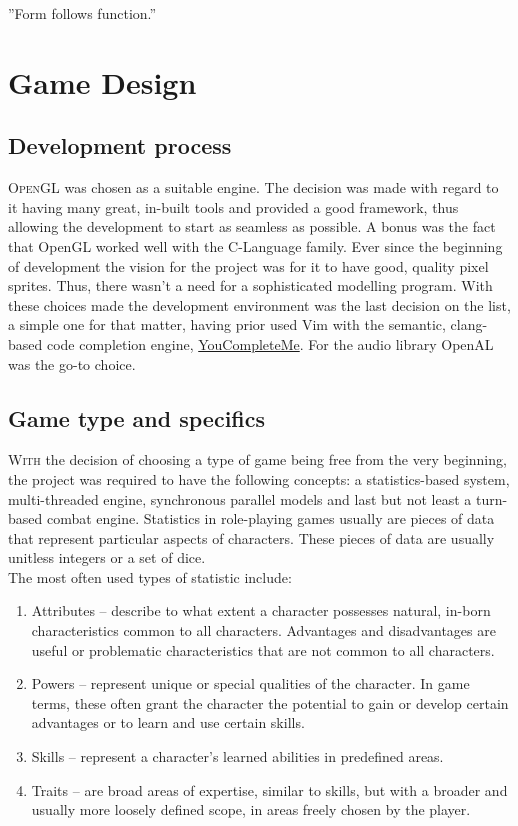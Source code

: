 \begin{savequote}[75mm] 
”Form follows function.”
\end{savequote}

\chapter{Game Design}
\section{Development process}
\lettrine[lines=1]{\color{Crimson}O}{penGL} was chosen as a suitable engine. The decision was made with regard to it having many great, in-built tools and provided a good framework, thus allowing the development to start as seamless as possible. A bonus was the fact that OpenGL\cite{Shreiner2013} worked well with the C-Language family\cite{Ritchie1988}. Ever since the beginning of development the vision for the project was for it to have good, quality pixel sprites. Thus, there wasn't a need for a sophisticated modelling program.
With these choices made the development environment was the last decision on the list, a simple one for that matter, having prior used Vim with the semantic, clang-based code completion engine, \href{http://valloric.github.io/YouCompleteMe}{YouCompleteMe}. For the audio library OpenAL was the go-to choice.\\
\newpage
\section{Game type and specifics}
\lettrine[lines=1]{\color{Crimson}W}{ith} the decision of choosing a type of game being free from the very beginning, the project was required to have the following concepts: a statistics-based system, multi-threaded engine\cite{c.gamasutra, c.bitsquid}, synchronous parallel models and last but not least a turn-based combat engine. Statistics in role-playing games usually are pieces of data that represent particular aspects of characters. These pieces of data are usually unitless integers or a set of dice.\\
The most often used types of statistic include:
\begin{enumerate}
\item Attributes
\noindent -- describe to what extent a character possesses natural, in-born characteristics common to all characters.
Advantages and disadvantages are useful or problematic characteristics that are not common to all characters.
\item Powers
\noindent -- represent unique or special qualities of the character. In game terms, these often grant the character the potential to gain or develop certain advantages or to learn and use certain skills.
\item Skills
\noindent -- represent a character's learned abilities in predefined areas.
\item Traits
\noindent -- are broad areas of expertise, similar to skills, but with a broader and usually more loosely defined scope, in areas freely chosen by the player.
\end{enumerate}

\afterpage{\clearpage}